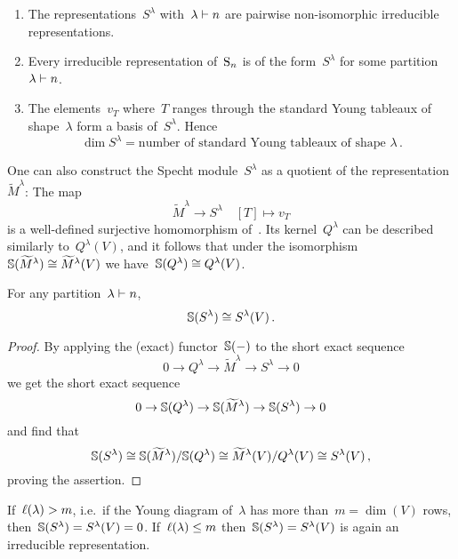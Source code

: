 \documentclass[a4paper,10pt]{scrartcl}
\begin{document}
\begin{theorem}
  \label{irreps of sn}
  \leavevmode
  \begin{enumerate}
    \item
      The representations~$S^\lambda$ with~$\lambda \vdash n$ are pairwise non-isomorphic irreducible representations.
    \item
      Every irreducible representation of~$\operatorname{S}_n$ is of the form~$S^\lambda$ for some partition~$\lambda \vdash n$.
    \item
      The elements~$v_T$ where~$T$ ranges through the standard Young tableaux of shape~$\lambda$ form a basis of~$S^\lambda$.
      Hence
      \[
        \dim S^\lambda
        =
        \text{number of standard Young tableaux of shape~$\lambda$} \,.
      \]
  \end{enumerate}
\end{theorem}

One can also construct the Specht module~$S^{\lambda}$ as a quotient of the representation~$\widetilde{M}^\lambda$:
The map
\[
  \widetilde{M}^\lambda
  \to
  S^\lambda
  \quad
  [T]
  \mapsto
  v_T
\]
is a well-defined surjective homomorphism of~{}.
Its kernel~$Q^\lambda$ can be described similarly to~$Q^\lambda(V)$, and it follows that under the isomorphism~$\mathbb{S}(\widetilde{M}^\lambda) \cong \widetilde{M}^\lambda(V)$ we have~$\mathbb{S}(Q^\lambda) \cong Q^{\lambda}(V)$.

\begin{theorem}
  For any partition~$\lambda \vdash n$,
  \[
    \mathbb{S}(S^\lambda) \cong S^{\lambda}(V) \,.
  \]
\end{theorem}

\begin{proof}
  By applying the (exact) functor~$\mathbb{S}(-)$ to the short exact sequence
  \[
    0
    \to
    Q^\lambda
    \to
    \widetilde{M}^\lambda
    \to
    S^\lambda
    \to
    0
  \]
  we get the short exact sequence
  \[
    0
    \to
    \mathbb{S}(Q^\lambda)
    \to
    \mathbb{S}(\widetilde{M}^\lambda)
    \to
    \mathbb{S}(S^\lambda)
    \to
    0
  \]
  and find that
  \[
    \mathbb{S}(S^\lambda)
    \cong
    \mathbb{S}(\widetilde{M}^\lambda)/\mathbb{S}(Q^\lambda)
    \cong
    \widetilde{M}^{\lambda}(V)/Q^{\lambda}(V)
    \cong
    S^{\lambda}(V) \,,
  \]
  proving the assertion.
\end{proof}


\begin{remark}
  \label{kernel of schur functor}
  If~$\operatorname{\ell}(\lambda) > m$, i.e.\ if the Young diagram of~$\lambda$ has more than~$m = \dim(V)$ rows, then~$\mathbb{S}(S^\lambda) = S^\lambda(V) = 0$.
  If~$\operatorname{\ell}(\lambda) \leq m$ then~$\mathbb{S}(S^\lambda) = S^\lambda(V)$ is again an irreducible representation.
\end{remark}
\end{document}
